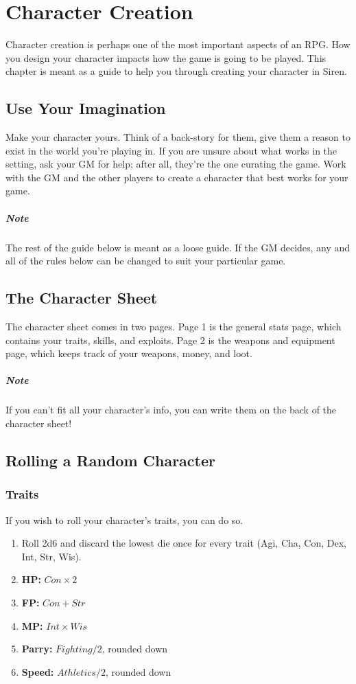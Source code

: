 \chapter{Character Creation}
Character creation is perhaps one of the most important aspects of an RPG.
How you design your character impacts how the game is going to be played.
This chapter is meant as a guide to help you through creating your character in Siren.

\section{Use Your Imagination}
Make your character yours.
Think of a back-story for them, give them a reason to exist in the world you're playing in.
If you are unsure about what works in the setting, ask your GM for help; after all, they're the one curating the game.
Work with the GM and the other players to create a character that best works for your game.

\paragraph{Note} The rest of the guide below is meant as a loose guide.
If the GM decides, any and all of the rules below can be changed to suit your particular game.

\section{The Character Sheet}
The character sheet comes in two pages.
Page 1 is the general stats page, which contains your traits, skills, and exploits.
Page 2 is the weapons and equipment page, which keeps track of your weapons, money, and loot.

\paragraph{Note} If you can't fit all your character's info, you can write them on the back of the character sheet!

\section{Rolling a Random Character}
\subsection{Traits}
If you wish to roll your character's traits, you can do so.
\begin{enumerate}
\item Roll 2d6 and discard the lowest die once for every trait (Agi, Cha, Con, Dex, Int, Str, Wis).
\item \textbf{HP:} $Con \times 2$
\item \textbf{FP:} $Con + Str$
\item \textbf{MP:} $Int \times Wis$
\item \textbf{Parry:} $Fighting / 2$, rounded down
\item \textbf{Speed:} $Athletics / 2$, rounded down
\end{enumerate}

